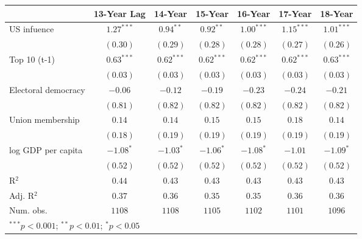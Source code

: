 
\begin{table}
\begin{center}
\begin{tabular}{l c c c c c c}
\toprule
 & 13-Year Lag & 14-Year & 15-Year & 16-Year & 17-Year & 18-Year \\
\midrule
US infuence         & $\mathbf{1.27}^{***}$ & $\mathbf{0.94}^{**}$  & $\mathbf{0.92}^{**}$  & $\mathbf{1.00}^{***}$ & $\mathbf{1.15}^{***}$ & $\mathbf{1.01}^{***}$ \\
                    & $(0.30)$              & $(0.29)$              & $(0.28)$              & $(0.28)$              & $(0.27)$              & $(0.26)$              \\
Top 10 (t-1)        & $\mathbf{0.63}^{***}$ & $\mathbf{0.62}^{***}$ & $\mathbf{0.62}^{***}$ & $\mathbf{0.62}^{***}$ & $\mathbf{0.62}^{***}$ & $\mathbf{0.63}^{***}$ \\
                    & $(0.03)$              & $(0.03)$              & $(0.03)$              & $(0.03)$              & $(0.03)$              & $(0.03)$              \\
Electoral democracy & $-0.06$               & $-0.12$               & $-0.19$               & $-0.23$               & $-0.24$               & $-0.21$               \\
                    & $(0.81)$              & $(0.82)$              & $(0.82)$              & $(0.82)$              & $(0.82)$              & $(0.82)$              \\
Union membership    & $0.14$                & $0.14$                & $0.15$                & $0.15$                & $0.18$                & $0.14$                \\
                    & $(0.18)$              & $(0.19)$              & $(0.19)$              & $(0.19)$              & $(0.19)$              & $(0.19)$              \\
log GDP per capita  & $\mathbf{-1.08}^{*}$  & $\mathbf{-1.03}^{*}$  & $\mathbf{-1.06}^{*}$  & $\mathbf{-1.08}^{*}$  & $-1.01$               & $\mathbf{-1.09}^{*}$  \\
                    & $(0.52)$              & $(0.52)$              & $(0.52)$              & $(0.52)$              & $(0.52)$              & $(0.52)$              \\
\midrule
R$^2$               & $0.44$                & $0.43$                & $0.43$                & $0.43$                & $0.43$                & $0.43$                \\
Adj. R$^2$          & $0.37$                & $0.36$                & $0.35$                & $0.35$                & $0.36$                & $0.36$                \\
Num. obs.           & $1108$                & $1108$                & $1105$                & $1102$                & $1101$                & $1096$                \\
\bottomrule
\multicolumn{7}{l}{\scriptsize{$^{***}p<0.001$; $^{**}p<0.01$; $^{*}p<0.05$}}
\end{tabular}
\label{table:coefficients}
\end{center}
\end{table}
